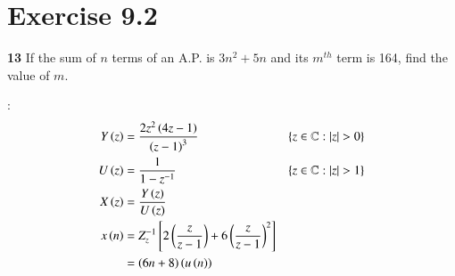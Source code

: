 \documentclass[journal,12pt,twocolumn]{IEEEtran}
\begin{document}


\vspace{3cm}

\title{}
\author{EE23BTECH11054 -  Sai Krishna Shanigarapu$^{*}$
}
\maketitle
\newpage
\bigskip


\section*{Exercise 9.2}

\noindent \textbf{13} \hspace{2pt}If the sum of $n$ terms of an A.P. is $3n^2+5n$ and its $m^{th}$ term is 164, find the value of $m$.
\bigskip

\solution:
\noindent
\begin{align}
Y \left(z\right) &= \frac{2z^2\left(4z-1\right)}{\left(z-1\right)^3} & \left\{z\in\mathbb{C} : |z| > 0\right\}\\
U\left(z\right) &= \frac{1}{1-z^{-1}} & \left\{z\in\mathbb{C} : |z| > 1\right\}\\
X\left(z\right) &=  \frac{Y\left(z\right)}{U\left(z\right)}\\
x\left(n\right) &= Z_{z}^{-1}\left[2\left(\frac{z}{z-1}\right) + 6\left(\frac{z}{z-1}\right) ^2\right]\\
&= \left(6n+8\right)\left(u\left(n\right)\right)
\end{align}
\end{document}
